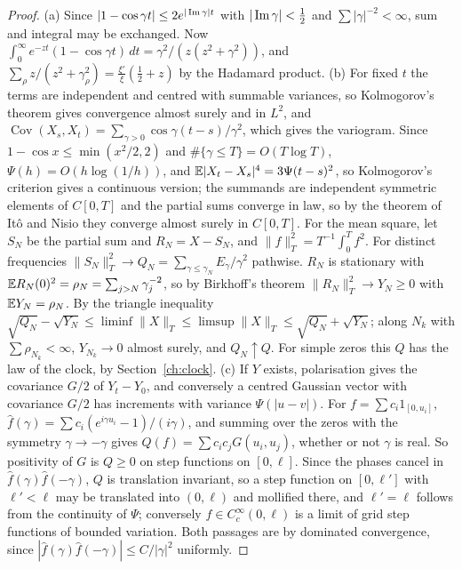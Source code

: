 \begin{proof}
(a) Since $|1-\cos\gamma t|\le2e^{|\operatorname{Im}\gamma|t}$ with $|\operatorname{Im}\gamma|<\frac12$ and $\sum|\gamma|^{-2}<\infty$, sum and integral may be exchanged. Now $\int_0^\infty e^{-zt}(1-\cos\gamma t)\,dt=\gamma^2/(z(z^2+\gamma^2))$, and $\sum_\rho z/(z^2+\gamma_\rho^2)=\frac{\xi'}\xi(\frac12+z)$ by the Hadamard product. (b) For fixed $t$ the terms are independent and centred with summable variances, so Kolmogorov's theorem gives convergence almost surely and in $L^2$, and $\operatorname{Cov}(X_s,X_t)=\sum_{\gamma>0}\cos\gamma(t-s)/\gamma^2$, which gives the variogram. Since $1-\cos x\le\min(x^2/2,2)$ and $\#\{\gamma\le T\}=O(T\log T)$, $\Psi(h)=O(h\log(1/h))$, and $\mathbb{E}|X_t-X_s|^4=3\Psi(t-s)^2$, so Kolmogorov's criterion gives a continuous version; the summands are independent symmetric elements of $C[0,T]$ and the partial sums converge in law, so by the theorem of It\^o and Nisio they converge almost surely in $C[0,T]$. For the mean square, let $S_N$ be the partial sum and $R_N=X-S_N$, and $\|f\|_T^2=T^{-1}\int_0^Tf^2$. For distinct frequencies $\|S_N\|_T^2\to Q_N=\sum_{\gamma\le\gamma_N}E_\gamma/\gamma^2$ pathwise. $R_N$ is stationary with $\mathbb{E} R_N(0)^2=\rho_N=\sum_{j>N}\gamma_j^{-2}$, so by Birkhoff's theorem $\|R_N\|_T^2\to Y_N\ge0$ with $\mathbb{E} Y_N=\rho_N$. By the triangle inequality $\sqrt{Q_N}-\sqrt{Y_N}\le\liminf\|X\|_T\le\limsup\|X\|_T\le\sqrt{Q_N}+\sqrt{Y_N}$; along $N_k$ with $\sum\rho_{N_k}<\infty$, $Y_{N_k}\to0$ almost surely, and $Q_N\uparrow Q$. For simple zeros this $Q$ has the law of the clock, by Section~\ref{ch:clock}. (c) If $Y$ exists, polarisation gives the covariance $G/2$ of $Y_t-Y_0$, and conversely a centred Gaussian vector with covariance $G/2$ has increments with variance $\Psi(|u-v|)$. For $f=\sum c_i1_{[0,u_i]}$, $\hat f(\gamma)=\sum c_i(e^{i\gamma u_i}-1)/(i\gamma)$, and summing over the zeros with the symmetry $\gamma\to-\gamma$ gives $Q(f)=\sum c_ic_jG(u_i,u_j)$, whether or not $\gamma$ is real. So positivity of $G$ is $Q\ge0$ on step functions on $[0,\ell]$. Since the phases cancel in $\hat f(\gamma)\hat f(-\gamma)$, $Q$ is translation invariant, so a step function on $[0,\ell']$ with $\ell'<\ell$ may be translated into $(0,\ell)$ and mollified there, and $\ell'=\ell$ follows from the continuity of $\Psi$; conversely $f\in C_c^\infty(0,\ell)$ is a limit of grid step functions of bounded variation. Both passages are by dominated convergence, since $|\hat f(\gamma)\hat f(-\gamma)|\le C/|\gamma|^2$ uniformly.
\end{proof}

